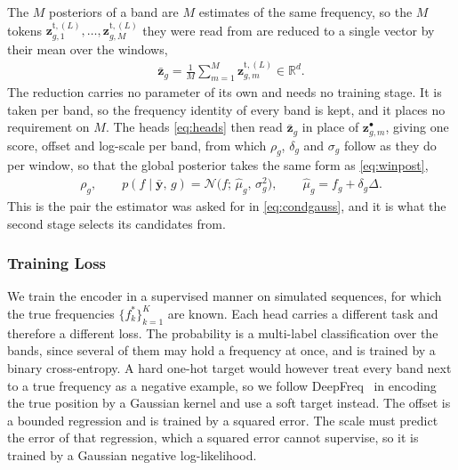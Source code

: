 \documentclass[journal,onecolumn]{IEEEtran}
\begin{document}
The $M$ posteriors of a band are $M$ estimates of the same frequency, so the $M$ tokens $\mathbf{z}^{\mathrm{t},(L)}_{g,1},\dots,\mathbf{z}^{\mathrm{t},(L)}_{g,M}$ they were read from are reduced to a single vector by their mean over the windows,
\begin{eqnarray}
\label{eq:fusion}
\bar{\mathbf{z}}_g=\frac{1}{M}\sum_{m=1}^{M}\mathbf{z}^{\mathrm{t},(L)}_{g,m}\in\mathbb{R}^{d}.
\end{eqnarray}
The reduction carries no parameter of its own and needs no training stage. It is taken per band, so the frequency identity of every band is kept, and it places no requirement on $M$. The heads \eqref{eq:heads} then read $\bar{\mathbf{z}}_g$ in place of $\mathbf{z}^{\bullet}_{g,m}$, giving one score, offset and log-scale per band, from which $\rho_g$, $\delta_g$ and $\sigma_g$ follow as they do per window, so that the global posterior takes the same form as \eqref{eq:winpost},
\begin{eqnarray}
\label{eq:globalpost}
\rho_g,\qquad p(f\mid\bar{\mathbf{y}},\,g)=\mathcal{N}\!\big(f;\,\hat\mu_g,\,\sigma_g^2\big),
\qquad \hat\mu_g=f_g+\delta_g\Delta.
\end{eqnarray}
This is the pair the estimator was asked for in \eqref{eq:condgauss}, and it is what the second stage selects its candidates from.

\subsubsection{Training Loss}
\label{sec:loss}

We train the encoder in a supervised manner on simulated sequences, for which the true frequencies $\{f_k^\ast\}_{k=1}^{K}$ are known. Each head carries a different task and therefore a different loss. The probability is a multi-label classification over the bands, since several of them may hold a frequency at once, and is trained by a binary cross-entropy. A hard one-hot target would however treat every band next to a true frequency as a negative example, so we follow DeepFreq~\cite{izacard_data-driven_2021} in encoding the true position by a Gaussian kernel and use a soft target instead. The offset is a bounded regression and is trained by a squared error. The scale must predict the error of that regression, which a squared error cannot supervise, so it is trained by a Gaussian negative log-likelihood.
\end{document}
